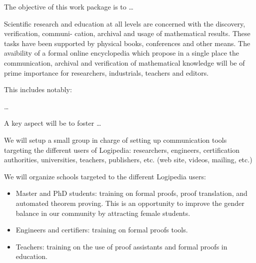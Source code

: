 \begin{workpackage}[id=dissemination,wphases=0-48,type=MGT,
  short=Dissemination,%
  title={Dissemination, communication, and exploitation},
  lead=Inr,
  BolRM=3,
  InrRM=10]

\begin{wpobjectives}
  The objective of this work package is to \ldots

Scientific research and education at all levels are concerned with the discovery, verification, communi- cation, archival and usage of mathematical results. These tasks have been supported by physical books, conferences and other means.
The avaibility of a formal online encyclopedia which propose in a single place the communication, archival and verification of mathematical knowledge will be of prime importance for researchers, industrials, teachers and editors.


This includes notably:
  \begin{compactitem}
  \item \ldots
  \end{compactitem}
  A key aspect will be to foster \ldots
\end{wpobjectives}

\begin{wpdescription}
   
\end{wpdescription}

\begin{tasklist}
  \begin{task}[id=com,title=Communication]
    We will setup a small group in charge of setting up communication
    tools targeting the different users of Logipedia: researchers,
    engineers, certification authorities, universities, teachers,
    publishers, etc. (web site, videos, mailing, etc.)
  \end{task}

  \begin{task}[id=schools,title=Training Logipedia users]
    We will organize schools targeted to the different Logipedia users:
    \begin{itemize}
    \item Master and PhD students: training on formal proofs, proof
      translation, and automated theorem proving. This is an
      opportunity to improve the gender balance in our community by
      attracting female students.
    \item Engineers and certifiers: training on formal proofs tools.
    \item Teachers: training on the use of proof assistants and formal
      proofs in education.
    \end{itemize}
  \end{task}


\end{tasklist}
\end{workpackage}
